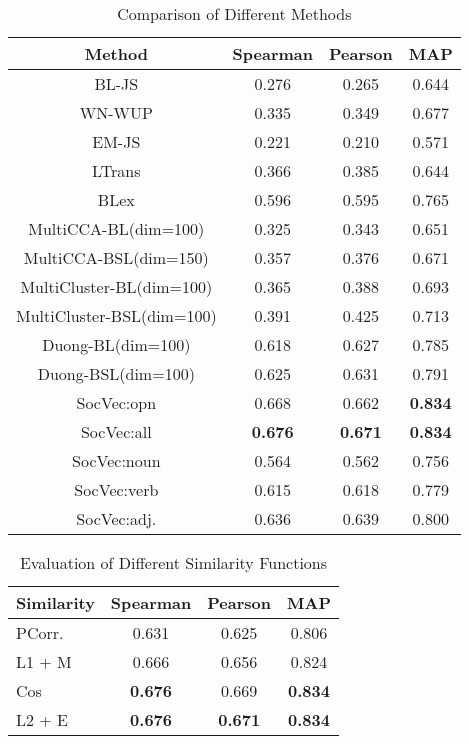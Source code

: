 \begin{table}[t]
	\scriptsize
	\centering
	\caption{{\small Comparison of Different Methods}}
	\begin{tabular}{c|c|c|c}
		
		\textbf{Method} & \textbf{Spearman} & \textbf{Pearson}  & \textbf{MAP} \\ \hline
		BL-JS& 0.276 & 0.265 & 0.644   \\ 
		WN-WUP  & 0.335 & 0.349 & 0.677 \\ 
		EM-JS & 0.221 & 0.210  & 0.571\\ 
		LTrans& 0.366 & 0.385  & 0.644  \\
		BLex& 0.596 & 0.595  & 0.765 \\ \hline 
MultiCCA-BL(dim=100)&0.325&0.343&0.651\\  
MultiCCA-BSL(dim=150)&0.357&0.376&0.671\\ 
MultiCluster-BL(dim=100)&0.365&0.388&0.693\\ 
MultiCluster-BSL(dim=100)&0.391&0.425&0.713\\ 
Duong-BL(dim=100)&0.618&0.627&0.785\\ 
Duong-BSL(dim=100)&0.625&0.631&0.791 \\ \hline 
		SocVec:opn& 0.668 & 0.662   & \textbf{0.834} \\ 
		SocVec:all& \textbf{0.676} & \textbf{0.671}  & \textbf{0.834}\\ 
		SocVec:noun & 0.564 & 0.562 & 0.756 \\ 
		SocVec:verb & 0.615 & 0.618 & 0.779 \\ 
		SocVec:adj. & 0.636 & 0.639 & 0.800 \\ \hline
	\end{tabular}
	\label{tab:mcdne_res_1}
\end{table}
\begin{table}[h]
	\centering
	\scriptsize
	\caption{{\small Evaluation of Different Similarity Functions \vspace{-10pt}}}
	\label{tab:mcdne_res_2}
	\begin{tabular}{l|c|c|c}
		\textbf{Similarity} & \textbf{Spearman} & \textbf{Pearson}   & \textbf{MAP} \\ \hline
		PCorr. & 0.631 & 0.625 & 0.806\\ 
		L1 + M & 0.666 & 0.656 & 0.824 \\  
		Cos & \textbf{0.676} & 0.669 & \textbf{0.834} \\ 
		L2 + E & \textbf{0.676} & \textbf{0.671} & \textbf{0.834} \\ \hline
	\end{tabular}
\end{table}

